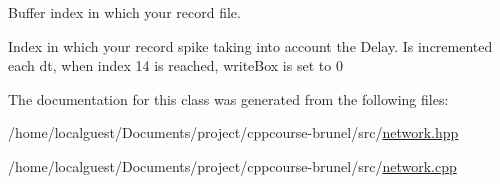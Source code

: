 Buffer index in which your record file. 

Index in which your record spike taking into account the Delay. Is incremented each dt, when index 14 is reached, write\-Box is set to 0 

The documentation for this class was generated from the following files\-:\begin{DoxyCompactItemize}
\item 
/home/localguest/\-Documents/project/cppcourse-\/brunel/src/\hyperlink{network_8hpp}{network.\-hpp}\item 
/home/localguest/\-Documents/project/cppcourse-\/brunel/src/\hyperlink{network_8cpp}{network.\-cpp}\end{DoxyCompactItemize}
